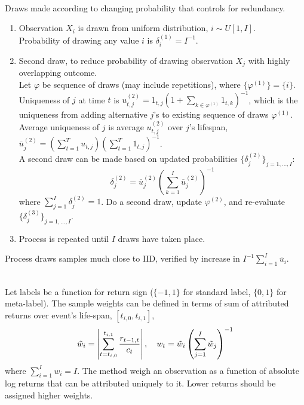\documentclass[a4paper,oneside,openany]{book}
\begin{document}
\begin{method} \\
Draws made according to changing probability that controls for redundancy.
\begin{enumerate}[label=\roman*.]
\setlength{\itemsep}{0pt}
\item Observation $X_i$ is drawn from uniform distribution, $i \sim U[1, I]$.\\
Probability of drawing any value $i$ is $\delta^{(1)}_i = I^{-1}$.
\item Second draw, to reduce probability of drawing observation $X_j$ with highly overlapping outcome.\\
Let $\varphi$ be sequence of draws (may include repetitions), where $\{\varphi^{(1)}\} = \{i\}$.\\
Uniqueness of $j$ at time $t$ is $u^{(2)}_{t,j} = 1_{t,j} (1 + \sum_{k \in \varphi^{(1)}} 1_{t,k})^{-1}$, which is the uniqueness from adding alternative $j$'s to existing sequence of draws $\varphi^{(1)}$.\\
Average uniqueness of $j$ is average $u^{(2)}_{t,j}$ over $j$'s lifespan, $\overline{u}^{(2)}_j = (\sum_{t=1}^T u_{t,j}) (\sum_{t=1}^T 1_{t,j})^{-1}$.\\
A second draw can be made based on updated probabilities $\{\delta^{(2)}_j\}_{j = 1, \ldots, I}$:
\begin{equation*}
\delta^{(2)}_j = \overline{u}^{(2)}_j \left( \sum\limits_{k=1}^I \overline{u}^{(2)}_j \right)^{-1} \nonumber
\end{equation*}
where $\sum_{j=1}^I \delta^{(2)}_j = 1$.
Do a second draw, update $\varphi^{(2)}$, and re-evaluate $\{\delta^{(3)}_j \}_{j=1, \ldots, I}$.
\item Process is repeated until $I$ draws have taken place.
\end{enumerate}
Process draws samples much close to IID, verified by increase in $I^{-1} \sum_{i=1}^I \overline{u}_i$.
\end{method}

\begin{method} \\
Let labels be a function for return sign ($\{-1, 1\}$ for standard label, $\{0, 1\}$ for meta-label). The sample weights can be defined in terms of sum of attributed returns over event's life-span, $[t_{i,0}, t_{i,1}]$,
\begin{equation*}
\tilde{w}_{i} = \left\lvert\sum\limits_{t = t_{i,0}}^{t_{i,1}} \frac{r_{t-1, t}}{c_t}\right\rvert, \ \ \ w_t = \tilde{w}_{i} \left( \sum\limits_{j=1}^I \tilde{w}_j \right)^{-1} \nonumber
\end{equation*}
where $\sum_{i=1}^I w_i = I$. The method weigh an observation as a function of absolute log returns that can be attributed uniquely to it. Lower returns should be assigned higher weights.
\end{method}
\end{document}
